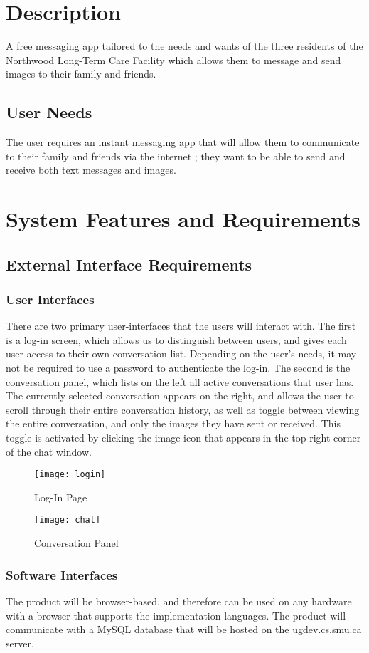 \documentclass[11pt]{article}
\begin{document}
\section{Description}
A free messaging app tailored to the needs and wants of the three residents
of the Northwood Long-Term Care Facility which allows them to message and
send images to their family and friends.
\subsection{User Needs}
The user requires an instant messaging app that will allow them to communicate
to their family and friends via the internet ; they want to be able to send
and receive both text messages and images.
\section{System Features and Requirements}
\subsection{External Interface Requirements}
\subsubsection{User Interfaces}
There are two primary user-interfaces that the users will interact with. The first is a log-in
screen, which allows us to distinguish between users, and gives each user access to their own
conversation list. Depending on the user's needs, it may not be required to use a password to
authenticate the log-in. The second is the conversation panel, which lists on the left all active
conversations that user has. The currently selected conversation appears on the right, and allows
the user to scroll through their entire conversation history, as well as toggle between viewing the
entire conversation, and only the images they have sent or received. This toggle is activated by
clicking the image icon that appears in the top-right corner of the chat window.

\begin{figure}[!htb]
  \texttt{[image: login]}
  \caption{Log-In Page}
\end{figure}
\begin{figure}
    \texttt{[image: chat]}
    \caption{Conversation Panel}
\end{figure}
\FloatBarrier

\subsubsection{Software Interfaces}
The product will be browser-based, and therefore can be used on any hardware with a browser that
supports the implementation languages. The product will communicate with a MySQL database that will
be hosted on the \url{ugdev.cs.smu.ca} server.
\end{document}
